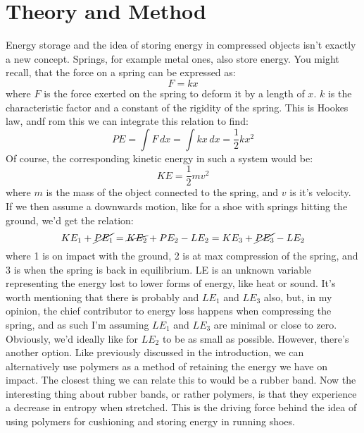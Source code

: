 \documentclass{article}
\begin{document}
\section{Theory and Method}
Energy storage and the idea of storing energy in compressed objects isn't exactly a new concept. Springs, for example metal ones, also store energy. \newline You might recall, that the force on a spring can be expressed as:
\begin{equation*}
    F = kx
\end{equation*}
\newline where $F$ is the force exerted on the spring to deform it by a length of $x$. $k$ is the characteristic factor and a constant of the rigidity of the spring. This is Hookes law, andf rom this we can integrate this relation to find:
\begin{equation}
    PE = \int F \,dx = \int kx \,dx = \frac{1}{2} k x^2
\end{equation}
\newline Of course, the corresponding kinetic energy in such a system would be:
\begin{equation}
    KE = \frac{1}{2} mv^2
\end{equation}
where $m$ is the mass of the object connected to the spring, and $v$ is it's velocity. \newline
If we then assume a downwards motion, like for a shoe with springs hitting the ground, we'd get the relation:
\begin{equation} \label{1}
    KE_1 + \cancel{PE_1} = \cancel{KE_2} + PE_2 - LE_2 = KE_3 + \cancel{PE_3} - LE_2
\end{equation}
where 1 is on impact with the ground, 2 is at max compression of the spring, and 3 is when the spring is back in equilibrium. LE is an unknown variable representing the energy lost to lower forms of energy, like heat or sound. It's worth mentioning that there is probably and $LE_1$ and $LE_3$ also, but, in my opinion, the chief contributor to energy loss happens when compressing the spring, and as such I'm assuming $LE_1$ and $LE_3$ are minimal or close to zero.
\newline
Obviously, we'd ideally like for $LE_2$ to be as small as possible.
\newline
However, there's another option. Like previously discussed in the introduction, we can alternatively use polymers as a method of retaining the energy we have on impact. The closest thing we can relate this to would be a rubber band. Now the interesting thing about rubber bands, or rather polymers, is that they experience a decrease in entropy when stretched. This is the driving force behind the idea of using polymers for cushioning and storing energy in running shoes. \newline
\end{document}

